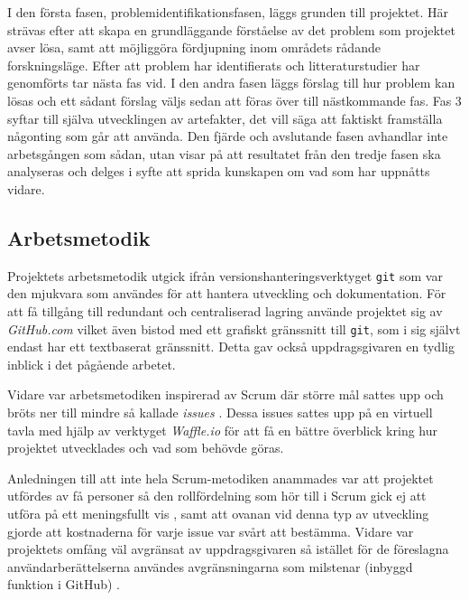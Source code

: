         I den första fasen, problemidentifikationsfasen, läggs grunden till projektet. Här strävas efter att skapa en grundläggande förståelse av det problem som projektet avser lösa, samt att möjliggöra fördjupning inom områdets rådande forskningsläge.
        Efter att problem har identifierats och litteraturstudier har genomförts tar nästa fas vid. I den andra fasen läggs förslag till hur problem kan lösas och ett sådant förslag väljs sedan att föras över till nästkommande fas.
        Fas 3 syftar till själva utvecklingen av artefakter, det vill säga att faktiskt framställa någonting som går att använda.
        Den fjärde och avslutande fasen avhandlar inte arbetsgången som sådan, utan visar på att resultatet från den tredje fasen ska analyseras och delges i syfte att sprida kunskapen om vad som har uppnåtts vidare.


    \subsection{Arbetsmetodik} %
    \label{sub:arbetsmetodik}
        Projektets arbetsmetodik utgick ifrån versionshanteringsverktyget \texttt{git} 
        som var den mjukvara som användes för att hantera utveckling och dokumentation. För att få tillgång 
        till redundant och centraliserad lagring använde projektet sig av \textit{GitHub.com} vilket även bistod med ett grafiskt gränssnitt till \texttt{git}, som i sig självt endast har ett textbaserat gränssnitt. Detta gav också uppdragsgivaren en tydlig inblick i det pågående arbetet. \bigskip

        Vidare var arbetsmetodiken inspirerad av Scrum där större mål sattes upp och bröts ner till mindre så kallade \textit{issues} \cite[kap.~8]{scrum}. Dessa issues sattes upp på en virtuell tavla med hjälp av verktyget \textit{Waffle.io} för att få en bättre överblick kring hur projektet utvecklades och vad som behövde göras. \bigskip

        Anledningen till att inte hela Scrum-metodiken anammades var att projektet utfördes av få personer så den rollfördelning som hör till i Scrum gick ej att utföra på ett meningsfullt vis \cite[kap.~6]{scrum}, samt att ovanan vid denna typ av utveckling gjorde att kostnaderna för varje issue var svårt att bestämma. Vidare var projektets omfång väl avgränsat av uppdrags\-givaren så istället för de föreslagna användarberättelserna användes avgränsningarna som milstenar (inbyggd funktion i GitHub) \cite[kap.~9]{scrum}.

